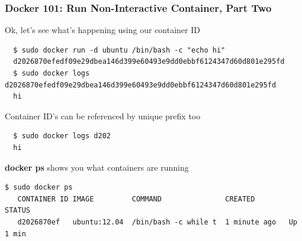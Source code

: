\documentclass[xcolor=dvipsnames]{beamer}
\newcommand{\cpause}{}
\begin{document}
\begin{frame}[fragile]
  \frametitle{Docker 101: Run Non-Interactive Container, Part Two}

  Ok, let's see what's happening using our container ID

  \begin{lstlisting}
  $ sudo docker run -d ubuntu /bin/bash -c "echo hi"
  d2026870efedf09e29dbea146d399e60493e9dd0ebbf6124347d60d801e295fd
  $ sudo docker logs d2026870efedf09e29dbea146d399e60493e9dd0ebbf6124347d60d801e295fd
  hi
  \end{lstlisting}
  \cpause

  Container ID's can be referenced by unique prefix too

  \begin{lstlisting}
  $ sudo docker logs d202
  hi
  \end{lstlisting}
  \cpause

  \textbf{docker ps} shows you what containers are running \cpause

  \begin{lstlisting}[basicstyle=\tiny]
   $ sudo docker ps
   CONTAINER ID IMAGE         COMMAND               CREATED        STATUS    
   d2026870ef   ubuntu:12.04  /bin/bash -c while t  1 minute ago   Up 1 min  
  \end{lstlisting}    
\end{frame}
\end{document}
